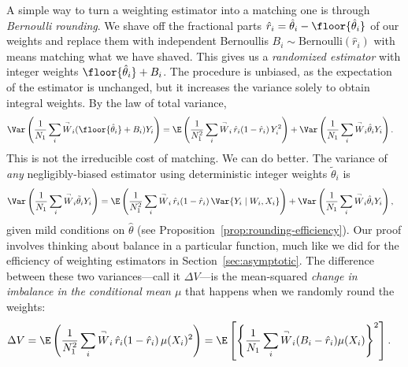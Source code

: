 
A simple way to turn a weighting estimator into a matching one is through \emph{Bernoulli rounding}. We shave off the fractional parts $\hat r_i = \hat\theta_i - \floor{\hat\theta_i}$ of our weights and replace them with independent Bernoullis $B_i \sim \text{Bernoulli}(\hat r_i)$ with means matching what we have shaved. This gives us a \emph{randomized estimator} with integer weights $\floor{\hat\theta_i} + B_i$. The procedure is unbiased, as the expectation of the estimator is unchanged, but it increases the variance solely to obtain integral weights. By the law of total variance,
\begin{equation}
\label{eq:bernoulli-rounding-variance}
\begin{aligned}
\Var\left(\frac{1}{N_1} \sum_i \overset{\neg}{W}_i (\floor{\hat\theta_i} + B_i) Y_i\right)
&= \E\left(\frac{1}{N_1^2} \sum_i \overset{\neg}{W}_i \, \hat r_i(1 - \hat r_i) \, Y_i^2 \right) + \Var\left(\frac{1}{N_1} \sum_i \overset{\neg}{W}_i \hat\theta_i Y_i\right).
\end{aligned}
\end{equation}
This is not the irreducible cost of matching. We can do better. The variance of \emph{any} negligibly-biased estimator using deterministic integer weights $\tilde\theta_i$ is
\begin{equation}
\label{eq:rounding-variance-deterministic}
\begin{aligned}
\Var\left(\frac{1}{N_1} \sum_i \overset{\neg}{W}_i \tilde\theta_i Y_i\right)
&= \E\left(\frac{1}{N_1^2} \sum_i \overset{\neg}{W}_i \, \hat r_i(1 - \hat r_i) \, \Var\{Y_i \mid W_i, X_i\} \right) + \Var\left(\frac{1}{N_1} \sum_i \overset{\neg}{W}_i \hat\theta_i Y_i\right),
\end{aligned}
\end{equation}
given mild conditions on $\hat\theta$ (see Proposition~\ref{prop:rounding-efficiency}). Our proof involves thinking about balance in a particular function, much like we did for the efficiency of weighting estimators in Section~\ref{sec:asymptotic}. The difference between these two variances---call it $\Delta V$---is the mean-squared \emph{change in imbalance in the conditional mean $\mu$} that happens when we randomly round the weights:
\begin{equation}
\label{eq:rounding-excess}
\begin{aligned}
\Delta V
&= \E\left(\frac{1}{N_1^2} \sum_i \overset{\neg}{W}_i \, \hat r_i(1 - \hat r_i) \, \mu(X_i)^2\right)
= \E\left[\left\{\frac{1}{N_1} \sum_i \overset{\neg}{W}_i (B_i - \hat r_i) \mu(X_i)\right\}^2\right].
\end{aligned}
\end{equation}
